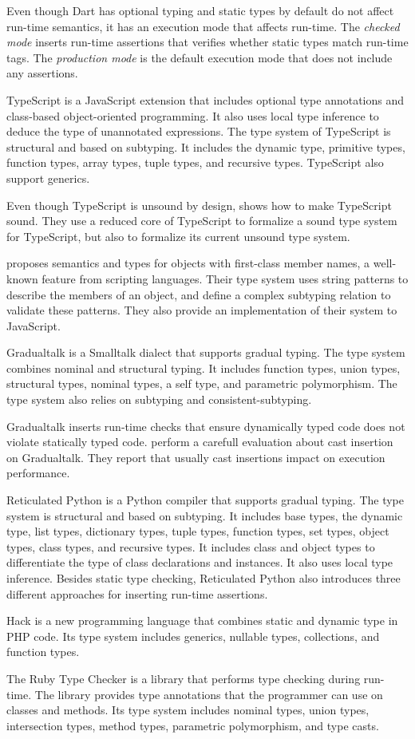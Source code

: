 Even though Dart has optional typing and static types by
default do not affect run-time semantics, it has an
execution mode that affects run-time.
The \emph{checked mode} inserts run-time assertions that
verifies whether static types match run-time tags.
The \emph{production mode} is the default execution mode
that does not include any assertions.

TypeScript \citep{typescript} is a JavaScript extension
that includes optional type annotations and class-based
object-oriented programming.
It also uses local type inference to deduce the type
of unannotated expressions.
The type system of TypeScript is structural and based
on subtyping.
It includes the dynamic type, primitive types, function
types, array types, tuple types, and recursive types.
TypeScript also support generics.

Even though TypeScript is unsound by design,
\citet{bierman2014typescript} shows how to make TypeScript sound.
They use a reduced core of TypeScript to formalize a
sound type system for TypeScript, but also to formalize
its current unsound type system.

\citet{politz2012semantics} proposes semantics and types for objects
with first-class member names, a well-known feature from scripting languages.
Their type system uses string patterns to describe the members of
an object, and define a complex subtyping relation to validate
these patterns.
They also provide an implementation of their system to JavaScript.

Gradualtalk \citep{allende2013gts} is a Smalltalk dialect that
supports gradual typing.
The type system combines nominal and structural typing.
It includes function types, union types, structural types,
nominal types, a self type, and parametric polymorphism.
The type system also relies on subtyping and consistent-subtyping.

Gradualtalk inserts run-time checks that ensure dynamically
typed code does not violate statically typed code.
\citet{allende2013cis} perform a carefull evaluation about
cast insertion on Gradualtalk.
They report that usually cast insertions impact on execution
performance.

Reticulated Python \citep{vitousek2014deg} is a Python compiler
that supports gradual typing.
The type system is structural and based on subtyping.
It includes base types, the dynamic type, list types,
dictionary types, tuple types, function types, set types,
object types, class types, and recursive types.
It includes class and object types to differentiate the
type of class declarations and instances.
It also uses local type inference.
Besides static type checking, Reticulated Python also introduces
three different approaches for inserting run-time assertions.

Hack \citep{hack} is a new programming language that combines
static and dynamic type in PHP code.
Its type system includes generics, nullable types, collections,
and function types.

The Ruby Type Checker \citep{ren2013rtc} is a library that
performs type checking during run-time.
The library provides type annotations that the programmer
can use on classes and methods.
Its type system includes nominal types, union types,
intersection types, method types, parametric polymorphism,
and type casts.

